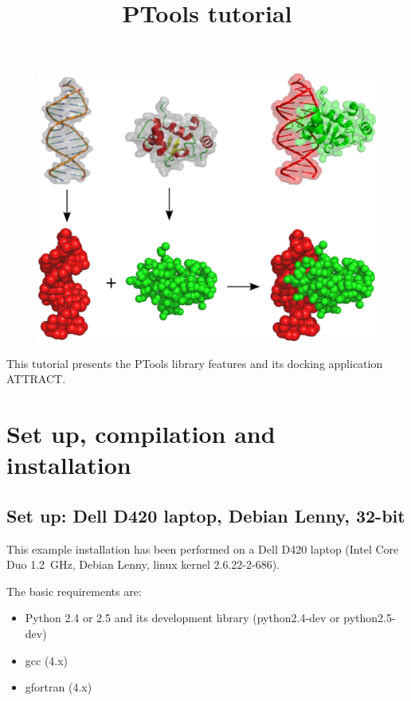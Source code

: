 \documentclass[12pt,a4paper]{article}
\begin{document}
\title{PTools tutorial}
\maketitle

\thispagestyle{empty}

\begin{figure}[htbp]
\center
\includegraphics*[width=0.80\linewidth]{img/docking.png}
\end{figure}


\vspace*{3cm}

\noindent
This tutorial presents the PTools library features and its docking application ATTRACT.

\newpage

\tableofcontents{}

\newpage

\section{Set up, compilation and installation}

\subsection{Set up: Dell D420 laptop, Debian Lenny, 32-bit}
This example installation has been performed on a Dell D420 laptop (Intel
Core Duo 1.2~GHz, Debian Lenny, linux kernel 2.6.22-2-686).

The basic requirements are:
\begin{itemize}
\item Python 2.4 or 2.5 and its development library (python2.4-dev or python2.5-dev)
\item gcc (4.x)
\item gfortran (4.x)
\end{itemize}
\end{document}
